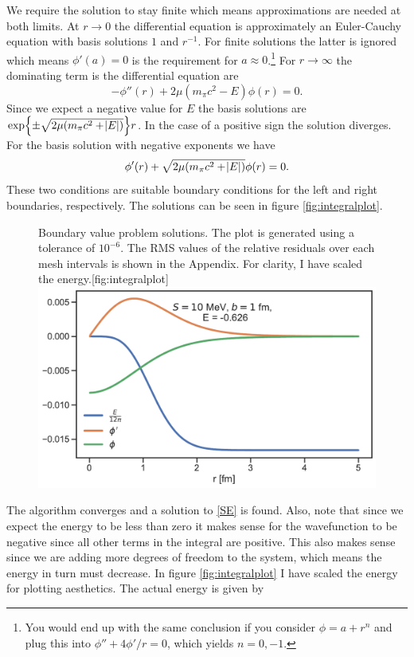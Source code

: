 We require the solution to stay finite which means approximations are needed at both limits. At $r\rightarrow 0$ the differential equation is approximately an Euler-Cauchy equation with basis solutions $1$ and $r^{-1}$. For finite solutions the latter is ignored which means $\phi'(a)=0$ is the requirement for $a\approx 0$.\footnote{You would end up with the same conclusion if you consider $\phi=a+r^n$ and plug this into $\phi''+4\phi'/r=0$, which yields $n=0,-1$.} For $r\rightarrow \infty$ the dominating term is the differential equation are
\begin{equation}
    -\phi''(r)+2\mu(m_\pi c^2-E)\phi(r)=0.
\end{equation}
Since we expect a negative value for $E$ the basis solutions are \\ $\exp{\pm\sqrt{2\mu(m_\pi c^2+\abs{E})}}r$. In the case of a positive sign the solution diverges. For the basis solution with negative exponents we have
\begin{equation}
    \phi'(r)+\sqrt{2\mu(m_\pi c^2 +\abs{E})}\phi(r)=0.
\end{equation}
These two conditions are suitable boundary conditions for the left and right boundaries, respectively. The solutions can be seen in figure \ref{fig:integralplot}.
\begin{figure}[H]
    \begin{sidecaption}{Boundary value problem solutions. The plot is generated using a tolerance of $10^{-6}$. The RMS values of the relative residuals over each mesh intervals is shown in the Appendix. For clarity, I have scaled the energy.}[fig:integralplot]
    \includegraphics[width=\linewidth]{Figures/Integralplot.pdf}
    \end{sidecaption}
\end{figure}
The algorithm converges and a solution to \eqref{SE} is found. Also, note that since we expect the energy to be less than zero it makes sense for the wavefunction to be negative since all other terms in the integral are positive. This also makes sense since we are adding more degrees of freedom to the system, which means the energy in turn must decrease. In figure \ref{fig:integralplot} I have scaled the energy for plotting aesthetics. The actual energy is given by
